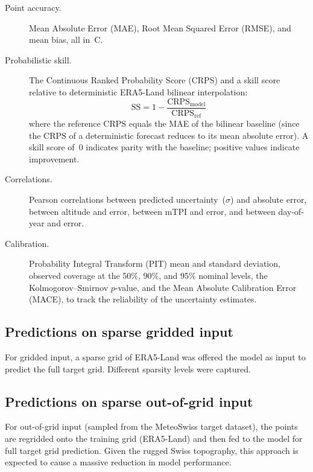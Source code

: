 \begin{description}
    \item[Point accuracy.] Mean Absolute Error (MAE), Root Mean Squared Error (RMSE), and mean bias, all in~\textdegree C.

    \item[Probabilistic skill.] The Continuous Ranked Probability Score (CRPS) and a skill score relative to deterministic ERA5-Land bilinear interpolation:
    \begin{equation}
        \text{SS} = 1 - \frac{\text{CRPS}_{\text{model}}}{\text{CRPS}_{\text{ref}}}
        \label{eq:skill_score}
    \end{equation}
    where the reference CRPS equals the MAE of the bilinear baseline (since the CRPS of a deterministic forecast reduces to its mean absolute error). A skill score of~0 indicates parity with the baseline; positive values indicate improvement.

    \item[Correlations.] Pearson correlations between predicted uncertainty~($\sigma$) and absolute error, between altitude and error, between mTPI and error, and between day-of-year and error.

    \item[Calibration.] Probability Integral Transform (PIT) mean and standard deviation, observed coverage at the 50\%, 90\%, and 95\% nominal levels, the Kolmogorov--Smirnov $p$-value, and the Mean Absolute Calibration Error (MACE), to track the reliability of the uncertainty estimates.
\end{description}

\subsection{Predictions on sparse gridded input}

For gridded input, a sparse grid of ERA5-Land was offered the model as input to predict the full target grid. Different sparsity levels were captured.

\subsection{Predictions on sparse out-of-grid input}

For out-of-grid input (sampled from the MeteoSwiss target dataset), the points are regridded onto the training grid (ERA5-Land) and then fed to the model for full target grid prediction. Given the rugged Swiss topography, this approach is expected to cause a massive reduction in model performance.

